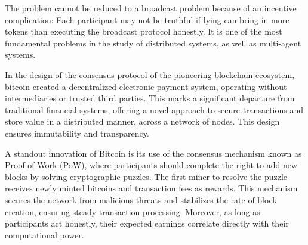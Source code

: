 The problem cannot be reduced to a broadcast problem because of an incentive complication: 
Each participant may not be truthful if lying can bring in more tokens than executing the broadcast protocol honestly. 
It is one of the most fundamental problems in the study of distributed systems, as well as multi-agent systems. 




In the design of the consensus protocol
of the pioneering blockchain ecosystem, bitcoin \cite{nakamoto2008bitcoin} 
created a decentralized electronic payment system, operating without intermediaries or trusted third parties.
This marks a significant departure from traditional financial systems, offering a novel approach to secure transactions and store value in a distributed manner, across a network of nodes. 
This design ensures immutability and transparency. 

A standout innovation of Bitcoin is its use of the consensus mechanism known as Proof of Work (PoW), where participants should complete the right to add new blocks by solving cryptographic puzzles.
The first miner to resolve the puzzle receives newly minted bitcoins and transaction fees as rewards.
This mechanism secures the network from malicious threats and stabilizes the rate of block creation, ensuring steady transaction processing. 
Moreover, as long as participants act honestly, their expected earnings correlate directly with their computational power.




